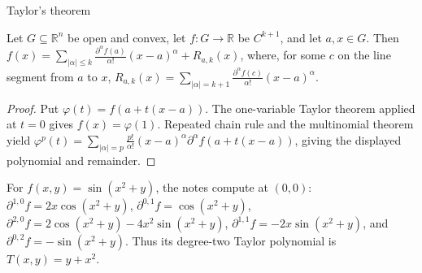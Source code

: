 \begin{theorem}{Taylor's theorem}

Let \(G \subseteq \mathbb{R}^{n}\) be open and convex, let \(f:G\rightarrow\mathbb{R}\) be \(C^{k + 1}\), and let \(a,x \in G\). Then \(f(x) = \sum_{{|\alpha|} \leq k}\frac{\partial^{\alpha}f(a)}{\alpha!}\left( {x - a} \right)^{\alpha} + R_{a,k}(x)\), where, for some \(c\) on the line segment from \(a\) to \(x\), \(R_{a,k}(x) = \sum_{{|\alpha|} = k + 1}\frac{\partial^{\alpha}f(c)}{\alpha!}\left( {x - a} \right)^{\alpha}\).

\end{theorem}

\begin{proof}

Put \(\varphi(t) = f\left( {a + t\left( {x - a} \right)} \right)\). The one-variable Taylor theorem applied at \(t = 0\) gives \(f(x) = \varphi(1)\). Repeated chain rule and the multinomial theorem yield \(\varphi^{p}(t) = \sum_{{|\alpha|} = p}\frac{p!}{\alpha!}\left( {x - a} \right)^{\alpha}\partial^{\alpha}f\left( {a + t\left( {x - a} \right)} \right)\), giving the displayed polynomial and remainder.

\end{proof}

\begin{example}

For \(f\left( {x,y} \right) = \sin\left( {x^{2} + y} \right)\), the notes compute at \(\left( {0,0} \right)\): \(\partial^{1,0}f = 2x\cos\left( {x^{2} + y} \right)\), \(\partial^{0,1}f = \cos\left( {x^{2} + y} \right)\), \(\partial^{2,0}f = 2\cos\left( {x^{2} + y} \right) - 4x^{2}\sin\left( {x^{2} + y} \right)\), \(\partial^{1,1}f = - 2x\sin\left( {x^{2} + y} \right)\), and \(\partial^{0,2}f = - \sin\left( {x^{2} + y} \right)\). Thus its degree-two Taylor polynomial is \(T\left( {x,y} \right) = y + x^{2}\).

\end{example}
